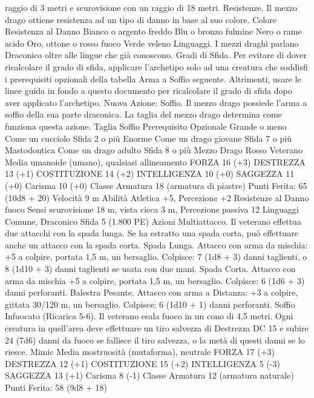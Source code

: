 \begin{multicols}{2}
raggio di 3 metri e scurovisione con un raggio di 18
metri.
Resistenze. Il mezzo drago ottiene resistenza ad un
tipo di danno in base al suo colore.
Colore Resistenza al Danno
Bianco o argento freddo
Blu o bronzo fulmine
Nero o rame acido
Oro, ottone o rosso fuoco
Verde veleno
Linguaggi. I mezzi draghi parlano Draconico oltre alle
lingue che già conoscono.
Gradi di Sfida. Per evitare di dover ricalcolare il grado
di sfida, applicare l’archetipo solo ad una creatura che
soddisfi i prerequisiti opzionali della tabella Arma a
Soffio seguente. Altrimenti, usare le linee guida in fondo
a questo documento per ricalcolare il grado di sfida
dopo aver applicato l’archetipo.
Nuova Azione: Soffio. Il mezzo drago possiede l’arma
a soffio della sua parte draconica. La taglia del mezzo
drago determina come funziona questa azione.
Taglia Soffio Prerequisito Opzionale
Grande o meno Come un cucciolo Sfida 2 o più
Enorme Come un drago giovane Sfida 7 o più
Mastodontica Come un drago adulto Sfida 8 o più
Mezzo Drago Rosso Veterano
Media umanoide (umano), qualsiasi allineamento
FORZA 16 (+3)
DESTREZZA 13 (+1)
COSTITUZIONE 14 (+2)
INTELLIGENZA 10 (+0)
SAGGEZZA 11 (+0)
Carisma 10 (+0)
Classe Armatura 18 (armatura di piastre)
\hspace*{0pt}\hfill{Punti Ferita}: 65 (10d8 + 20)
Velocità 9 m
Abilità Atletica +5, Percezione +2
Resistenze al Danno fuoco
Sensi scurovisione 18 m, vista cieca 3 m, Percezione passiva 12
Linguaggi Comune, Draconico
Sfida 5 (1.800 PE)
Azioni
Multiattacco. Il veterano effettua due attacchi con la spada
lunga. Se ha estratto una spada corta, può effettuare anche un
attacco con la spada corta.
Spada Lunga. Attacco con arma da mischia: +5 a colpire,
portata 1,5 m, un bersaglio.
Colpisce: 7 (1d8 + 3) danni taglienti, o 8 (1d10 + 3) danni
taglienti se usata con due mani.
Spada Corta. Attacco con arma da mischia +5 a colpire, portata
1,5 m, un bersaglio.
Colpisce: 6 (1d6 + 3) danni perforanti.
Balestra Pesante. Attacco con arma a Distanza: +3 a colpire,
gittata 30/120 m, un bersaglio.
Colpisce: 6 (1d10 + 1) danni perforanti.
Soffio Infuocato (Ricarica 5-6). Il veterano esala fuoco in un
cono di 4,5 metri. Ogni creatura in quell’area deve effettuare un
tiro salvezza di Destrezza DC 15 e subire 24 (7d6) danni da
fuoco se fallisce il tiro salvezza, o la metà di questi danni se lo
riesce.
Mimic
Media mostruosità (mutaforma), neutrale
FORZA 17 (+3)
DESTREZZA 12 (+1)
COSTITUZIONE 15 (+2)
INTELLIGENZA 5 (-3)
SAGGEZZA 13 (+1)
Carisma 8 (-1)
Classe Armatura 12 (armatura naturale)
\hspace*{0pt}\hfill{Punti Ferita}: 58 (9d8 + 18)

\end{multicols}
